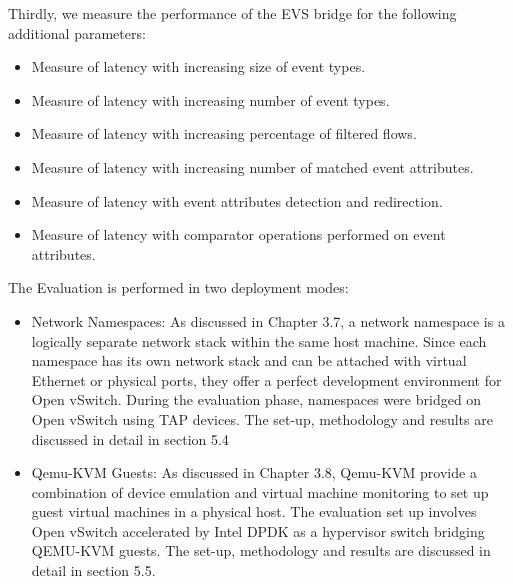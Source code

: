 Thirdly, we measure the performance of the EVS bridge for the following additional parameters:
\begin{itemize}
	\item Measure of latency with increasing size of event types.
	\item Measure of latency with increasing number of event types.
	\item Measure of latency with increasing percentage of filtered flows.
	\item Measure of latency with increasing number of matched event attributes. 
	\item Measure of latency with event attributes detection and redirection.
	\item Measure of latency with comparator operations performed on event attributes.
\end{itemize}

The Evaluation is performed in two deployment modes:
\begin{itemize}
	\item Network Namespaces: As discussed in Chapter 3.7, a network namespace is a logically separate network stack within the same host machine. Since each namespace has its own network stack and can be attached with virtual Ethernet or physical ports, they offer a perfect development environment for Open vSwitch. During the evaluation phase, namespaces were bridged on Open vSwitch using TAP devices. The set-up, methodology and results are discussed in detail in section 5.4
	\item Qemu-KVM Guests: As discussed in Chapter 3.8, Qemu-KVM provide a combination of device emulation and virtual machine monitoring to set up guest virtual machines in a physical host. The evaluation set up involves Open vSwitch accelerated by Intel DPDK as a hypervisor switch bridging QEMU-KVM guests. The set-up, methodology and results are discussed in detail in section 5.5.
\end{itemize}


